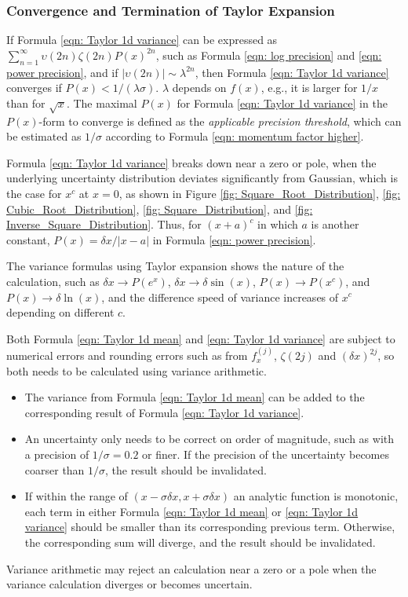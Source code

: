 \documentclass[twoside]{article}
\numberwithin{equation}{section}
\begin{document}
\subsubsection{Convergence and Termination of Taylor Expansion}


If Formula \eqref{eqn: Taylor 1d variance} can be expressed as $\sum_{n=1}^{\infty} \upsilon(2n) \zeta(2n) P(x)^{2n}$, such as Formula \eqref{eqn: log precision} and \eqref{eqn: power precision}, and if $|\upsilon(2n)| \sim \lambda^{2n}$, then Formula \eqref{eqn: Taylor 1d variance} converges if $P(x) < 1/(\lambda \sigma)$.
$\lambda$ depends on $f(x)$, e.g., it is larger for $1/x$ than for $\sqrt{x}$.
The maximal $P(x)$ for Formula \eqref{eqn: Taylor 1d variance} in the $P(x)$-form to converge is defined as the \emph{applicable precision threshold}, which can be estimated as $1/\sigma$ according to Formula \eqref{eqn: momentum factor higher}.

Formula \eqref{eqn: Taylor 1d variance} breaks down near a zero or pole, when the underlying uncertainty distribution deviates significantly from Gaussian, which is the case for $x^c$ at $x=0$, as shown in Figure \ref{fig: Square_Root_Distribution}, \ref{fig: Cubic_Root_Distribution}, \ref{fig: Square_Distribution}, and \ref{fig: Inverse_Square_Distribution}.
Thus, for $(x+a)^c$ in which $a$ is another constant, $P(x) = \delta x / |x - a|$ in Formula \eqref{eqn: power precision}.

The variance formulas using Taylor expansion shows the nature of the calculation, such as $\delta x \rightarrow P(e^x)$, $\delta x \rightarrow \delta \sin(x)$, $P(x) \rightarrow P(x^c)$, and $P(x) \rightarrow \delta \ln(x)$, and the difference speed of variance increases of $x^c$ depending on different $c$.

Both Formula \eqref{eqn: Taylor 1d mean} and \eqref{eqn: Taylor 1d variance} are subject to numerical errors and rounding errors such as from $f^{(j)}_x$, $\zeta(2j)$ and $(\delta x)^{2j}$, so both needs to be calculated using variance arithmetic.
\begin{itemize}
\item  The variance from Formula \eqref{eqn: Taylor 1d mean} can be added to the corresponding result of Formula \eqref{eqn: Taylor 1d variance}.

\item An uncertainty only needs to be correct on order of magnitude, such as with a precision of $1/\sigma=0.2$ or finer.
If the precision of the uncertainty becomes coarser than $1/\sigma$, the result should be invalidated.

\item If within the range of $(x - \sigma \delta x, x + \sigma \delta x)$ an analytic function is monotonic, each term in either Formula \eqref{eqn: Taylor 1d mean} or \eqref{eqn: Taylor 1d variance} should be smaller than its corresponding previous term.
Otherwise, the corresponding sum will diverge, and the result should be invalidated.

\end{itemize}
Variance arithmetic may reject an calculation near a zero or a pole when the variance calculation diverges or becomes uncertain.
\end{document}
